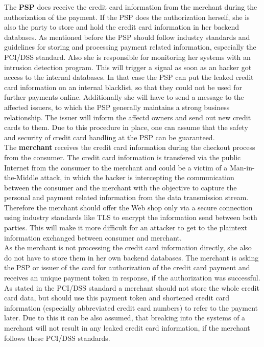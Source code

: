 The \textbf{\gls{PSP}} does receive the credit card information from the merchant during the authorization of the payment. If the \gls{PSP} does the authorization herself, she is also the party to store and hold the credit card information in her backend databases. As mentioned before the \gls{PSP} should follow industry standards and guidelines for storing and processing payment related information, especially the PCI/DSS standard. Also she is responsible for monitoring her systems with an intrusion detection program. This will trigger a signal as soon as an hacker got access to the internal databases. In that case the \gls{PSP} can put the leaked credit card information on an internal blacklist, so that they could not be used for further payments online. Additionally she will have to send a message to the affected issuers, to which the \gls{PSP} generally maintains a strong business relationship. The issuer will inform the affectd owners and send out new credit cards to them. Due to this procedure in place, one can assume that the safety and security of credit card handling at the \gls{PSP} can be guaranteed. \\

The \textbf{merchant} receives the credit card information during the checkout process from the consumer. The credit card information is transfered via the public Internet from the consumer to the merchant and could be a victim of a Man-in-the-Middle attack, in which the hacker is intercepting the communication between the consumer and the merchant with the objective to capture the personal and payment related information from the data transmission stream. Therefore the merchant should offer the Web shop only via a secure connection using industry standards like TLS to encrypt the information send between both parties. This will make it more difficult for an attacker to get to the plaintext information exchanged between consumer and merchant. \\

As the merchant is not processing the credit card information directly, she also do not have to store them in her own backend databases. The merchant is asking the \gls{PSP} or issuer of the card for authorization of the credit card payment and receives an unique payment token in response, if the authorization was successful. As stated in the PCI/DSS standard a merchant should not store the whole credit card data, but should use this payment token and shortened credit card information (especially abbreviated credit card numbers) to refer to the payment later. Due to this it can be also assumed, that breaking into the systems of a merchant will not result in any leaked credit card information, if the merchant follows these PCI/DSS standards. \\

